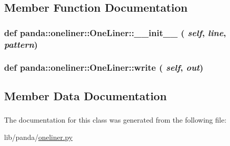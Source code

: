 \subsection{Member Function Documentation}
\hypertarget{classpanda_1_1oneliner_1_1OneLiner_a1ed959b91d6a8bda7eeaa46e09857fc4}{
\subsubsection[{\_\-\_\-init\_\-\_\-}]{\setlength{\rightskip}{0pt plus 5cm}def panda::oneliner::OneLiner::\_\-\_\-init\_\-\_\- ( {\em self}, \/   {\em line}, \/   {\em pattern})}}
\label{classpanda_1_1oneliner_1_1OneLiner_a1ed959b91d6a8bda7eeaa46e09857fc4}
\hypertarget{classpanda_1_1oneliner_1_1OneLiner_a43fa978a6b4ff7897b2155c8f92bad93}{
\subsubsection[{write}]{\setlength{\rightskip}{0pt plus 5cm}def panda::oneliner::OneLiner::write ( {\em self}, \/   {\em out})}}
\label{classpanda_1_1oneliner_1_1OneLiner_a43fa978a6b4ff7897b2155c8f92bad93}


\subsection{Member Data Documentation}
\hypertarget{classpanda_1_1oneliner_1_1OneLiner_a8b607764372e2ee528f7cd605747ebbd}{
\subsubsection[{code}]{}}
\label{classpanda_1_1oneliner_1_1OneLiner_a8b607764372e2ee528f7cd605747ebbd}


The documentation for this class was generated from the following file:\begin{DoxyCompactItemize}
\item 
lib/panda/\hyperlink{oneliner_8py}{oneliner.py}\end{DoxyCompactItemize}
